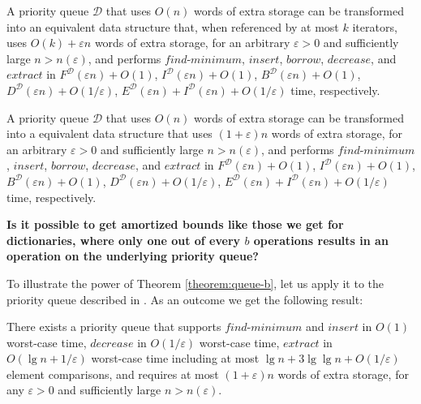 \documentclass{DIKU-article}
\newcommand{\Findmin}{\mbox{$\mathit{find}$\textnormal{-}}\allowbreak{}\mbox{$\mathit{minimum}$}}
\newcommand{\Insert}{\mbox{$\mathit{insert}$}}
\newcommand{\Extract}{\mbox{$\mathit{extract}$}}
\newcommand{\Decrease}{\mbox{$\mathit{decrease}$}}
\newcommand{\Borrow}{\mbox{$\mathit{borrow}$}}
\begin{document}
\begin{theorem}
\label{theorem:queue-a}
A priority queue $\mathcal{D}$ that uses $O(n)$ words of extra storage
can be transformed into an
equivalent data structure that, when referenced by at most $k$
iterators,
uses
$O(k)+\varepsilon n$ words of extra storage, for an arbitrary
$\varepsilon > 0$ and sufficiently large $n > n(\varepsilon)$, and performs 
\Findmin{}, \Insert{},
\Borrow{}, \Decrease{}, and \Extract{} in
$F^{\mathcal{D}}(\varepsilon n) + O(1)$,
$I^{\mathcal{D}}(\varepsilon n) + O(1)$,
$B^{\mathcal{D}}(\varepsilon n) + O(1)$,
$D^{\mathcal{D}}(\varepsilon n) + O(1/\varepsilon)$,
$E^{\mathcal{D}}(\varepsilon n) + I^{\mathcal{D}}(\varepsilon n) + O(1/\varepsilon)$ time, respectively.
\end{theorem}



\begin{theorem}
\label{theorem:queue-b}
A priority queue $\mathcal{D}$ that uses $O(n)$ words of extra storage
can be transformed into a equivalent data structure that
uses
$(1+\varepsilon)n$ words of extra storage, for an arbitrary
$\varepsilon > 0$ and sufficiently large $n > n(\varepsilon)$, and performs 
\Findmin{}, \Insert{},
\Borrow{}, \Decrease{}, and \Extract{} in
$F^{\mathcal{D}}(\varepsilon n) + O(1)$,
$I^{\mathcal{D}}(\varepsilon n) + O(1)$,
$B^{\mathcal{D}}(\varepsilon n) + O(1)$,
$D^{\mathcal{D}}(\varepsilon n) + O(1/\varepsilon)$,
$E^{\mathcal{D}}(\varepsilon n) + I^{\mathcal{D}}(\varepsilon n) + O(1/\varepsilon)$ time, respectively.
\end{theorem}

\noindent\textbf{Is it possible to get amortized bounds like those we
get for dictionaries, where only one out of every $b$ operations
results in an operation on the underlying priority queue?}

To illustrate the power of Theorem \ref{theorem:queue-b}, let us apply
it to the priority queue described in \cite{EJK06}. As an outcome we
get the following result:

\begin{corollary}
\label{corollary:queue}
There exists a priority queue that supports \Findmin{} and \Insert{}
in $O(1)$ worst-case time, \Decrease{} in $O(1/\varepsilon)$
worst-case time, \Extract{} in $O(\lg n + 1/\varepsilon)$ worst-case
time including at most $\lg n + 3\lg\lg n + O(1/\varepsilon)$ element
comparisons, and requires at most $(1 + \varepsilon)n$ words of extra
storage, for any $\varepsilon > 0$ and sufficiently large $n > n(\varepsilon)$.
\end{corollary}
\end{document}

